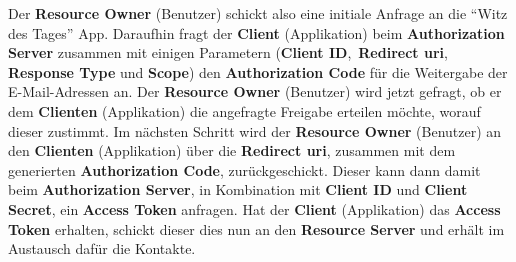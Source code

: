 		Der \textbf{Resource Owner} (Benutzer) schickt also eine initiale Anfrage an die \enquote{Witz des Tages} App.
		Daraufhin fragt der \textbf{Client} (Applikation) beim \textbf{Authorization Server}
		zusammen mit einigen Parametern
		(\textbf{Client ID},~\textbf{Redirect \gls{uri}}, \textbf{Response Type} und \textbf{Scope})
		den \textbf{Authorization Code} für die Weitergabe der E-Mail-Adressen an.
		Der \textbf{Resource Owner} (Benutzer) wird jetzt gefragt,
		ob er dem \textbf{Clienten} (Applikation) die angefragte Freigabe erteilen möchte,
		worauf dieser zustimmt.
		Im nächsten Schritt wird der \textbf{Resource Owner} (Benutzer) an den \textbf{Clienten} (Applikation)
		über die \textbf{Redirect \gls{uri}},
		zusammen mit dem generierten \textbf{Authorization Code},
		zurückgeschickt.
		Dieser kann dann damit beim \textbf{Authorization Server},
		in Kombination mit \textbf{Client ID} und \textbf{Client Secret},
		ein \textbf{Access Token} anfragen.
		Hat der \textbf{Client} (Applikation) das \textbf{Access Token} erhalten,
		schickt dieser dies nun an den \textbf{Resource Server}
		und erhält im Austausch dafür die Kontakte.

